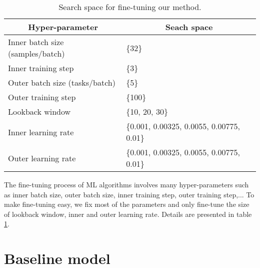 \begin{table}[H]
    \centering
    \caption{Search space for fine-tuning our method.}
    \label{tab:our_finetune}
    \begin{tabular}{ll} 
    \toprule
    \multicolumn{1}{c}{Hyper-parameter} & \multicolumn{1}{c}{Seach space}   \\ 
    \hline
    Inner batch size (samples/batch)    & \{32\}                            \\
    Inner training step                 & \{3\}                             \\
    Outer batch size (tasks/batch)      & \{5\}                             \\
    Outer training step                 & \{100\}                           \\ 
    \hline
    Lookback window                     & \{10, 20, 30\}                    \\
    Inner learning rate                 & \{0.001, 0.00325, 0.0055, 0.00775, 0.01\}\\
    Outer learning rate                 & \{0.001, 0.00325, 0.0055, 0.00775, 0.01\}\\
    \bottomrule
    \end{tabular}
\end{table}


The fine-tuning process of ML algorithms involves many hyper-parameters such as inner batch size, outer batch size, inner training step, outer training step,... To make fine-tuning easy, we fix most of the parameters and only fine-tune the size of lookback window, inner and outer learning rate. Details are presented in table \ref{tab:our_finetune}.


\section{Baseline model}

